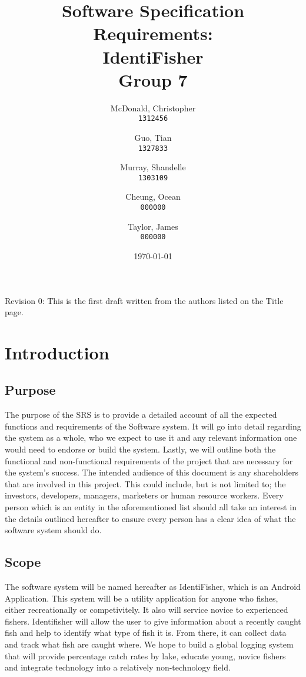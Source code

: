 \documentclass{article}
\title{Software Specification Requirements: \\ IdentiFisher \\ Group 7}
\author{
McDonald, Christopher\\
\texttt{1312456}
\and
Guo, Tian\\
\texttt{1327833}
\and
Murray, Shandelle\\
\texttt{1303109}
\and
Cheung, Ocean\\
\texttt{000000}
\and
Taylor, James\\
\texttt{000000}
}
\date{\today}
\begin{document}
\maketitle

\newpage

\tableofcontents

\vspace*{\fill}
Revision 0: This is the first draft written from the authors listed on the Title page.

\section{Introduction}

\subsection{Purpose}
The purpose of the SRS is to provide a detailed account of all the expected functions
and requirements of the Software system. It will go into detail regarding the system
as a whole, who we expect to use it and any relevant information one would need
to endorse or build the system. Lastly, we will outline both the functional and
non-functional requirements of the project that are necessary for the system's
success. The intended audience of this document is any shareholders that are involved in this
project. This could include, but is not limited to; the investors, developers, managers,
marketers or human resource workers. Every person which is an entity in the aforementioned
list should all take an interest in the details outlined hereafter to ensure every person
has a clear idea of what the software system should do.

\subsection{Scope}
The software system will be named hereafter as IdentiFisher, which is an Android Application.
This system will be a utility application for anyone who fishes, either recreationally or
competivitely. It also will service novice to experienced fishers. Identifisher will allow
the user to give information about a recently caught fish and help to identify what type
of fish it is. From there, it can collect data and track what fish are caught where. We
hope to build a global logging system that will provide percentage catch rates by lake,
educate young, novice fishers and integrate technology into a relatively non-technology field.
\end{document}

